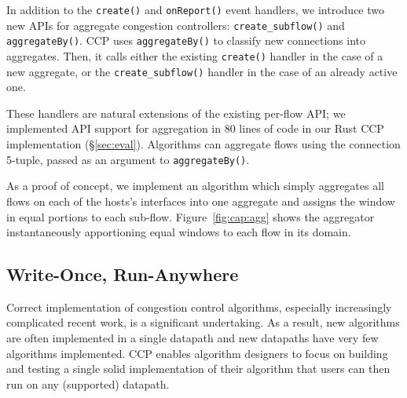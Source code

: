 %

 In addition to the \texttt{create()} and \texttt{onReport()} event handlers, we introduce two new APIs for aggregate congestion controllers: \texttt{create\_subflow()} and \texttt{aggregateBy()}.
CCP uses \texttt{aggregateBy()} to classify new connections into aggregates. Then, it calls either the existing \texttt{create()} handler in the case of a new aggregate, or the \texttt{create\_subflow()} handler in the case of an already active one.

These handlers are natural extensions of the existing per-flow API; we implemented API support for aggregation in $80$ lines of code in our Rust CCP implementation (\S\ref{sec:eval}).
Algorithms can aggregate flows using the connection 5-tuple, passed as an argument to \texttt{aggregateBy()}.

As a proof of concept, we implement an algorithm which simply aggregates all flows on each of the hosts's interfaces into one aggregate and assigns the window in equal portions to each sub-flow.
Figure~\ref{fig:cap:agg} shows the aggregator instantaneously apportioning equal windows to each flow in its domain.

 
\subsection{Write-Once, Run-Anywhere}
\label{s:capabilities:wora}
\label{s:datapaths:eval}

Correct implementation of congestion control algorithms, especially increasingly complicated recent work, is a significant undertaking.
As a result, new algorithms are often implemented in a single datapath and new datapaths have very few algorithms implemented. 
CCP enables algorithm designers to focus on building and testing a single solid implementation of their algorithm that users can then run on any (supported) datapath. 


